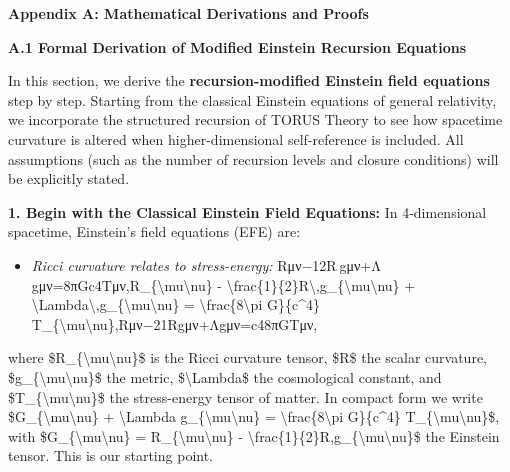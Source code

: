 \documentclass[
]{article}
\author{}
\date{}
\begin{document}
\textbf{Appendix A: Mathematical Derivations and Proofs}

\textbf{A.1 Formal Derivation of Modified Einstein Recursion Equations}

In this section, we derive the \textbf{recursion-modified Einstein field
equations} step by step. Starting from the classical Einstein equations
of general relativity, we incorporate the structured recursion of TORUS
Theory to see how spacetime curvature is altered when higher-dimensional
self-reference is included. All assumptions (such as the number of
recursion levels and closure conditions) will be explicitly stated.

\textbf{1. Begin with the Classical Einstein Field Equations:} In
4-dimensional spacetime, Einstein's field equations (EFE) are:

\begin{itemize}
\item
  \emph{Ricci curvature relates to stress-energy:}
  Rμν−12R gμν+Λ gμν=8πGc4Tμν,R\_\{\textbackslash mu\textbackslash nu\} -
  \textbackslash frac\{1\}\{2\}R\textbackslash,g\_\{\textbackslash mu\textbackslash nu\}
  +
  \textbackslash Lambda\textbackslash,g\_\{\textbackslash mu\textbackslash nu\}
  = \textbackslash frac\{8\textbackslash pi G\}\{c\^{}4\}
  T\_\{\textbackslash mu\textbackslash nu\},Rμν\hspace{0pt}−21\hspace{0pt}Rgμν\hspace{0pt}+Λgμν\hspace{0pt}=c48πG\hspace{0pt}Tμν\hspace{0pt},
\end{itemize}

where \$R\_\{\textbackslash mu\textbackslash nu\}\$ is the Ricci
curvature tensor, \$R\$ the scalar curvature,
\$g\_\{\textbackslash mu\textbackslash nu\}\$ the metric,
\$\textbackslash Lambda\$ the cosmological constant, and
\$T\_\{\textbackslash mu\textbackslash nu\}\$ the stress-energy tensor
of matter. In compact form we write
\$G\_\{\textbackslash mu\textbackslash nu\} + \textbackslash Lambda
g\_\{\textbackslash mu\textbackslash nu\} =
\textbackslash frac\{8\textbackslash pi G\}\{c\^{}4\}
T\_\{\textbackslash mu\textbackslash nu\}\$, with
\$G\_\{\textbackslash mu\textbackslash nu\} =
R\_\{\textbackslash mu\textbackslash nu\} -
\textbackslash frac\{1\}\{2\}R,g\_\{\textbackslash mu\textbackslash nu\}\$
the Einstein tensor. This is our starting point\hspace{0pt}.
\end{document}
